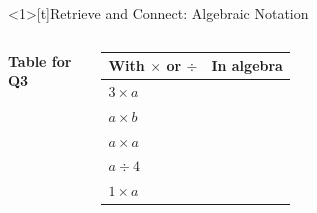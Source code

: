 \documentclass{beamer}
\newcommand{\ablank}[1]{%
  \alt<2>{\textcolor{red}{#1}}{\underline{\phantom{#1}}}%
}
\newcommand{\dheading}[1]{{\scriptsize\bfseries #1}\par\vspace{0.2em}}
\newcommand{\tblank}[1]{\ablank{\makebox[1.6em]{#1}}}
\newcommand{\tgiven}[1]{\makebox[1.6em]{#1}}
\begin{document}
\begin{frame}<1>[t]{Retrieve and Connect: Algebraic Notation}
\begin{columns}[T,onlytextwidth]

\vspace{-0.4em}
\dheading{Table for Q3}
{\footnotesize
\renewcommand{\arraystretch}{1.25}
\begin{tabular}{@{}l|l@{}}
  With $\times$ or $\div$ & In algebra\\ \hline
  $3\times a$ & \tgiven{$3a$}\\
  $a\times b$ & \tblank{$ab$}\\
  $a\times a$ & \tblank{$a^2$}\\
  $a\div4$    & \tblank{$\dfrac{a}{4}$}\\[2pt]
  $1\times a$ & \tblank{$a$}
\end{tabular}}


\end{columns}
\end{frame}
\end{document}
